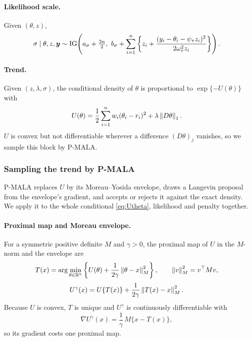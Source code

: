 \paragraph{Likelihood scale.} Given $(\theta, z)$,
\begin{equation}
    \sigma \mid \theta, z, \bm{y} \sim \mathrm{IG}\!\left(a_\sigma + \tfrac{3n}{2},\ b_\sigma + \sum_{i=1}^n \left\{ z_i + \frac{(y_i - \theta_i - \psi_\tau z_i)^2}{2\omega_\tau^2 z_i}\right\}\right).
    \label{eq:sigmaupdate}
\end{equation}

\paragraph{Trend.} Given $(z, \lambda, \sigma)$, the conditional density of $\theta$ is proportional to $\exp\{-U(\theta)\}$ with
\begin{equation}
    U(\theta) = \frac{1}{2}\sum_{i=1}^n w_i (\theta_i - r_i)^2 + \lambda \left\lVert D\theta\right\rVert_1 .
    \label{eq:Utheta}
\end{equation}
$U$ is convex but not differentiable wherever a difference $(D\theta)_j$ vanishes, so we sample this block by P-MALA.

\subsubsection{Sampling the trend by P-MALA}
\label{subsec:pmala}

P-MALA \citep{pereyra2016proximal} replaces $U$ by its Moreau--Yosida envelope, draws a Langevin proposal from the envelope's gradient, and accepts or rejects it against the exact density. We apply it to the whole conditional \eqref{eq:Utheta}, likelihood and penalty together.

\paragraph{Proximal map and Moreau envelope.} For a symmetric positive definite $M$ and $\gamma > 0$, the proximal map of $U$ in the $M$-norm and the envelope are
\begin{equation}
    T(x) = \arg\min_{\theta \in \mathbb{R}^n} \left\{ U(\theta) + \frac{1}{2\gamma}\left\lVert\theta - x\right\rVert_M^2 \right\}, \qquad \left\lVert v\right\rVert_M^2 = v^\top M v ,
    \label{eq:prox}
\end{equation}
\begin{equation}
    U^\gamma(x) = U\{T(x)\} + \frac{1}{2\gamma}\left\lVert T(x) - x\right\rVert_M^2 .
    \label{eq:envelope}
\end{equation}
Because $U$ is convex, $T$ is unique and $U^\gamma$ is continuously differentiable with
\begin{equation}
    \nabla U^\gamma(x) = \frac{1}{\gamma}\, M\{x - T(x)\},
    \label{eq:envelope_grad}
\end{equation}
so its gradient costs one proximal map.

